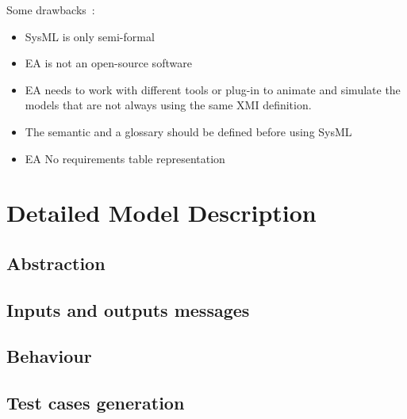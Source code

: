 \documentclass{openetcs_article}
\begin{document}
Some drawbacks~:
\begin{itemize}
\item SysML is only semi-formal
\item EA is not an  open-source software
\item EA needs to work with different tools or plug-in to animate and simulate
the models that are not always using the same XMI definition.
\item The semantic and a glossary should be defined before using SysML
\item EA No requirements table representation
\end{itemize}


\section{Detailed Model Description}
\label{sec:deta-model-descr}
  \subsection{Abstraction}
  

  \subsection{Inputs and outputs messages}
  

  \subsection{Behaviour}
  \label{subsec:behavior}
  

  \subsection{Test cases generation}
  \label{subsec:test_generation}
  




\end{document}

